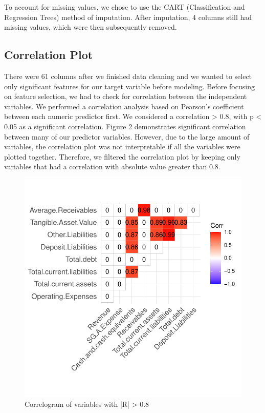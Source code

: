 \documentclass[11pt,]{article}
\begin{document}
To account for missing values, we chose to use the CART (Classification
and Regression Trees) method of imputation. After imputation, 4 columns
still had missing values, which were then subsequently removed.

\hypertarget{correlation-plot}{%
\subsection{Correlation Plot}\label{correlation-plot}}

There were 61 columns after we finished data cleaning and we wanted to
select only significant features for our target variable before
modeling. Before focusing on feature selection, we had to check for
correlation between the independent variables. We performed a
correlation analysis based on Pearson's coefficient between each numeric
predictor first. We considered a \textbar correlation\textbar{}
\textgreater{} 0.8, with p \textless{} 0.05 as a significant
correlation. Figure 2 demonstrates significant correlation between many
of our predictor variables. However, due to the large amount of
variables, the correlation plot was not interpretable if all the
variables were plotted together. Therefore, we filtered the correlation
plot by keeping only variables that had a correlation with absolute
value greater than 0.8.

\begin{figure}

{\centering \includegraphics{stock_analysis_files/figure-latex/corrplot-1} 

}

\caption{Correlogram of variables with |R| > 0.8}\label{fig:corrplot}
\end{figure}
\end{document}
